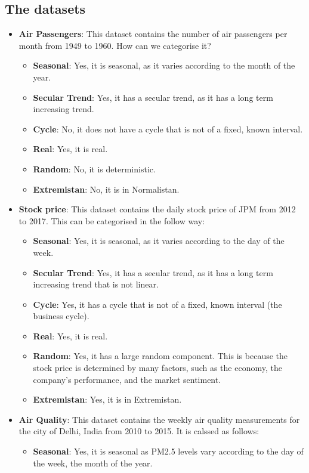 \documentclass[manuscript,screen,nonacm,11pt]{acmart}
\numberwithin{equation}{section}
\begin{document}
\subsection{The datasets}
\begin{itemize}
\item \textbf{Air Passengers}: This dataset contains the number of air passengers per month from 1949 to 1960. How can we categorise it? 
\begin{itemize}
	\item \textbf{Seasonal}: Yes, it is seasonal, as it varies according to the month of the year.
	\item \textbf{Secular Trend}: Yes, it has a secular trend, as it has a long term increasing trend.
	\item \textbf{Cycle}: No, it does not have a cycle that is not of a fixed, known interval.
	\item \textbf{Real}: Yes, it is real.
	\item \textbf{Random}: No, it is deterministic.
	\item \textbf{Extremistan}: No, it is in Normalistan.
\end{itemize}
\item \textbf{Stock price}: This dataset contains the daily stock price of JPM from 2012 to 2017. This can be categorised in the follow way:
\begin{itemize}
	\item \textbf{Seasonal}: Yes, it is seasonal, as it varies according to the day of the week.
	\item \textbf{Secular Trend}: Yes, it has a secular trend, as it has a long term increasing trend that is not linear.
	\item \textbf{Cycle}: Yes, it has a cycle that is not of a fixed, known interval (the business cycle).
	\item \textbf{Real}: Yes, it is real.
	\item \textbf{Random}: Yes, it has a large random component. This is because the stock price is determined by many factors, such as the economy, the company's performance, and the market sentiment.
	\item \textbf{Extremistan}: Yes, it is in Extremistan.
\end{itemize}
\item \textbf{Air Quality}: This dataset contains the weekly air quality measurements for the city of Delhi, India from 2010 to 2015. It is calssed as follows:
\begin{itemize}
	\item \textbf{Seasonal}: Yes, it is seasonal as PM2.5 levels vary according to the day of the week, the month of the year.

\end{itemize}
\end{itemize}
\end{document}
